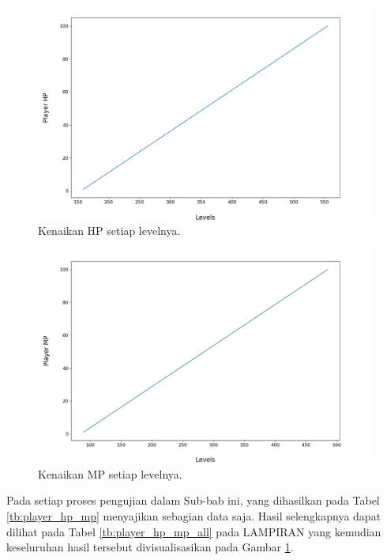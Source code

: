 \begin{figure} [!h] \centering
	\includegraphics[scale=0.45]{img/PlayerHpDistrib.png}
	\caption{Kenaikan HP setiap levelnya.}
	\vspace{-2ex}
	\label{fig:hp_player}
\end{figure}

\begin{figure} [!h] \centering
	\includegraphics[scale=0.45]{img/PlayerMpDistrib.png}
	\caption{Kenaikan MP setiap levelnya.}
	\vspace{-2ex}
	\label{fig:mp_player}
\end{figure}

Pada setiap proses pengujian dalam Sub-bab ini, yang dihasilkan pada Tabel \ref{tb:player_hp_mp} menyajikan sebagian data saja. Hasil selengkapnya dapat dilihat pada Tabel \ref{tb:player_hp_mp_all} pada LAMPIRAN yang kemudian keseluruhan hasil tersebut divisualisasikan pada Gambar \ref{fig:hp_player}.
\vspace{1ex}

